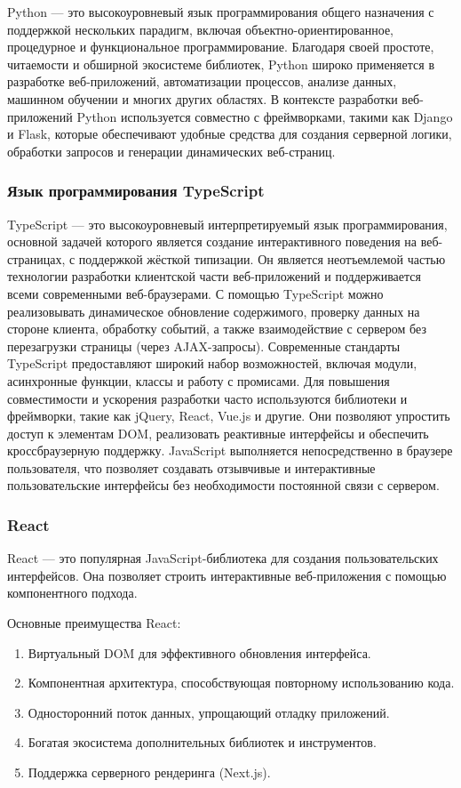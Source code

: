 Python — это высокоуровневый язык программирования общего назначения с поддержкой нескольких парадигм, включая объектно-ориентированное, процедурное и функциональное программирование. Благодаря своей простоте, читаемости и обширной экосистеме библиотек, Python широко применяется в разработке веб-приложений, автоматизации процессов, анализе данных, машинном обучении и многих других областях. В контексте разработки веб-приложений Python используется совместно с фреймворками, такими как Django и Flask, которые обеспечивают удобные средства для создания серверной логики, обработки запросов и генерации динамических веб-страниц.

\subsubsection{Язык программирования TypeScript}

TypeScript — это высокоуровневый интерпретируемый язык программирования, основной задачей которого является создание интерактивного поведения на веб-страницах, с поддержкой жёсткой типизации. Он является неотъемлемой частью технологии разработки клиентской части веб-приложений и поддерживается всеми современными веб-браузерами. С помощью TypeScript можно реализовывать динамическое обновление содержимого, проверку данных на стороне клиента, обработку событий, а также взаимодействие с сервером без перезагрузки страницы (через AJAX-запросы). Современные стандарты TypeScript предоставляют широкий набор возможностей, включая модули, асинхронные функции, классы и работу с промисами. Для повышения совместимости и ускорения разработки часто используются библиотеки и фреймворки, такие как jQuery, React, Vue.js и другие. Они позволяют упростить доступ к элементам DOM, реализовать реактивные интерфейсы и обеспечить кроссбраузерную поддержку. JavaScript выполняется непосредственно в браузере пользователя, что позволяет создавать отзывчивые и интерактивные пользовательские интерфейсы без необходимости постоянной связи с сервером.

\subsubsection{React}
React — это популярная JavaScript-библиотека для создания пользовательских интерфейсов. Она позволяет строить интерактивные веб-приложения с помощью компонентного подхода.

Основные преимущества React:
\begin{enumerate}
\item Виртуальный DOM для эффективного обновления интерфейса.
\item Компонентная архитектура, способствующая повторному использованию кода.
\item Односторонний поток данных, упрощающий отладку приложений.
\item Богатая экосистема дополнительных библиотек и инструментов.
\item Поддержка серверного рендеринга (Next.js).
\end{enumerate}

